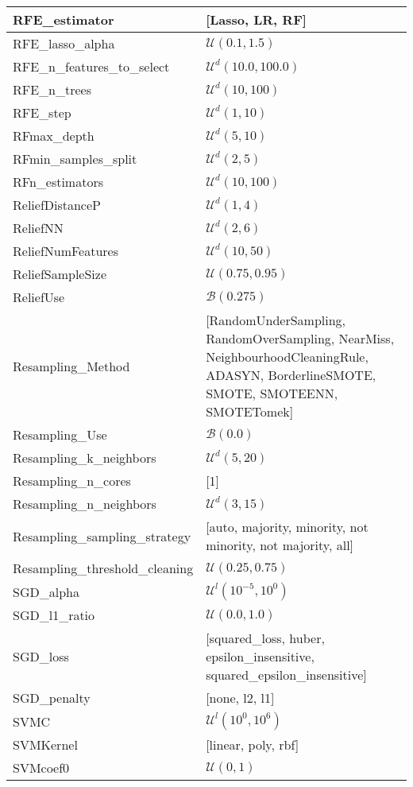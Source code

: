 \begin{table}[]
\begin{tabular}{l|l}
RFE\_estimator & {[Lasso, LR, RF]} \\ \hline
RFE\_lasso\_alpha & $\mathcal{U}(0.1, 1.5)$ \\ \hline
RFE\_n\_features\_to\_select & $\mathcal{U}^d(10.0, 100.0)$ \\ \hline
RFE\_n\_trees & $\mathcal{U}^d(10, 100)$ \\ \hline
RFE\_step & $\mathcal{U}^d(1, 10)$ \\ \hline
RFmax\_depth & $\mathcal{U}^d(5, 10)$ \\ \hline
RFmin\_samples\_split & $\mathcal{U}^d(2, 5)$ \\ \hline
RFn\_estimators & $\mathcal{U}^d(10, 100)$ \\ \hline
ReliefDistanceP & $\mathcal{U}^d(1, 4)$ \\ \hline
ReliefNN & $\mathcal{U}^d(2, 6)$ \\ \hline
ReliefNumFeatures & $\mathcal{U}^d(10, 50)$ \\ \hline
ReliefSampleSize & $\mathcal{U}(0.75, 0.95)$ \\ \hline
ReliefUse & $\mathcal{B}(0.275)$ \\ \hline
Resampling\_Method & {[RandomUnderSampling, RandomOverSampling, NearMiss, NeighbourhoodCleaningRule, ADASYN, BorderlineSMOTE, SMOTE, SMOTEENN, SMOTETomek]} \\ \hline
Resampling\_Use & $\mathcal{B}(0.0)$ \\ \hline
Resampling\_k\_neighbors & $\mathcal{U}^d(5, 20)$ \\ \hline
Resampling\_n\_cores & {[1]} \\ \hline
Resampling\_n\_neighbors & $\mathcal{U}^d(3, 15)$ \\ \hline
Resampling\_sampling\_strategy & {[auto, majority, minority, not minority, not majority, all]} \\ \hline
Resampling\_threshold\_cleaning & $\mathcal{U}(0.25, 0.75)$ \\ \hline
SGD\_alpha & $\mathcal{U}^l(10^{-5}, 10^{0})$ \\ \hline
SGD\_l1\_ratio & $\mathcal{U}(0.0, 1.0)$ \\ \hline
SGD\_loss & {[squared\_loss, huber, epsilon\_insensitive, squared\_epsilon\_insensitive]} \\ \hline
SGD\_penalty & {[none, l2, l1]} \\ \hline
SVMC & $\mathcal{U}^l(10^{0}, 10^{6})$ \\ \hline
SVMKernel & {[linear, poly, rbf]} \\ \hline
SVMcoef0 & $\mathcal{U}(0, 1)$ \\ \hline

\end{tabular}
\end{table}
